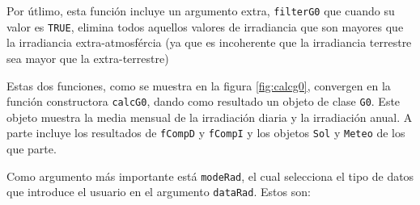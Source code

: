 \begin{itemize}
Por útlimo, esta función incluye un argumento extra, \texttt{filterG0} que cuando su valor es \texttt{TRUE}, elimina todos aquellos valores de irradiancia que son mayores que la irradiancia extra-atmosfércia (ya que es incoherente que la irradiancia terrestre sea mayor que la extra-terrestre)
\end{itemize}

Estas dos funciones, como se muestra en la figura \ref{fig:calcg0}, convergen en la función constructora \texttt{calcG0}, dando como resultado un objeto de clase \texttt{G0}. Este objeto muestra la media mensual de la irradiación diaria y la irradiación anual. A parte incluye los resultados de \texttt{fCompD} y \texttt{fCompI} y los objetos \texttt{Sol} y \texttt{Meteo} de los que parte.

Como argumento más importante está \texttt{modeRad}, el cual selecciona el tipo de datos que introduce el usuario en el argumento \texttt{dataRad}. Estos son:
